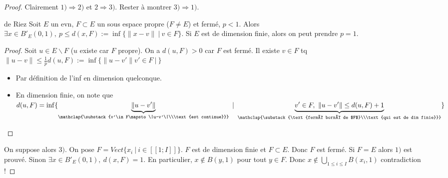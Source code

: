 \begin{proof}
    Clairement $1)\Rightarrow 2)$ et $2\Rightarrow 3).$ Rester à montrer $3)\Rightarrow 1).$
    \begin{lemme}{de Riez}
        Soit $E$ un evn, $F\subset E$ un sous espace propre ($F\neq E$) et fermé, $p<1.$ Alors $\exists x\in B'_E(0,1), \ p\le d(x,F):=\inf \{\|x-v\|\ |\ v\in F\} $. Si $E$ est de dimension finie, alors on peut prendre $p=1.$
    \end{lemme}
    \begin{proof}
        Soit $u\in E\backslash F$ ($u$ existe car $F$ propre). On a $d(u,F)>0$ car $F$ est fermé. Il existe $v\in F$ tq $\|u-v\|\le \frac{1}{p}d(u,F):=\inf \{\|u-v'\|v'\in F\ |\ \} $
        \begin{itemize}
            \item Par définition de l'inf en dimension quelconque.
            \item En dimension finie, on note que $d(u,F)=\inf \{\underbrace{\|u-v'\|}_{\mathclap{\substack{v'\in F\mapsto \|u-v'\|\\\text{est continue}}}}\ |\ \underbrace{v'\in F,\ \|u-v'\|\le d(u,F)+1}_{\mathclap{\substack{\text{fermé borné de $F$}\\\text{qui est de dim finie}}}} \} $
        \end{itemize}
    \end{proof}
    On suppose alors $3)$. On pose $F=Vect \{x_i\ |\ i\in [\![1;I]\!]\} $. $F$ est de dimension finie et $F\subset E.$ Donc $F$ est fermé. Si $F=E$ alors $1)$ est prouvé. Sinon $\exists x\in B'_E(0,1),\ d(x,F)=1.$ En particulier, $x\not\in B(y,1)$ pour tout $y\in F.$ Donc $x\not\in \bigcup\limits_{1\le i\le I} B(x_i,1)$ contradiction !
\end{proof}
